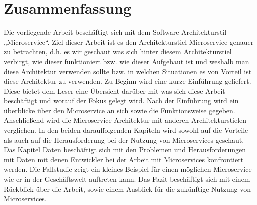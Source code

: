 \chapter*{Zusammenfassung}
Die vorliegende Arbeit beschäftigt sich mit dem Software Architekturstil „Microservice“. Ziel dieser Arbeit ist es den Architekturstiel Microservice genauer zu betrachten, d.h. es wir geschaut was sich hinter diesem Architekturstiel verbirgt, wie dieser funktioniert bzw. wie dieser Aufgebaut ist und weshalb man diese Architektur verwenden sollte bzw. in welchen Situationen es von Vorteil ist diese Architektur zu verwenden.\newline\newline
Zu Beginn wird eine kurze Einführung geliefert. Diese bietet dem Leser eine Übersicht darüber mit was sich diese Arbeit beschäftigt und worauf der Fokus gelegt wird. Nach der Einführung wird ein überblicke über den Microservice an sich sowie die Funktionsweise gegeben. Anschließend wird die Microservice-Architektur mit anderen Architekturstielen verglichen. In den beiden darauffolgenden Kapiteln wird sowohl auf die Vorteile als auch auf die Herausforderung bei der Nutzung von Microservices geschaut. Das Kapitel Daten beschäftigt sich mit den Problemen und Herausforderungen mit Daten mit denen Entwickler bei der Arbeit mit Microservices konfrontiert werden. Die Fallstudie zeigt ein kleines Beispiel für einen möglichen Microservice wie er in der Geschäftswelt auftreten kann. Das Fazit beschäftigt sich mit einem Rückblick über die Arbeit, sowie einem Ausblick für die zukünftige Nutzung von Microservices.